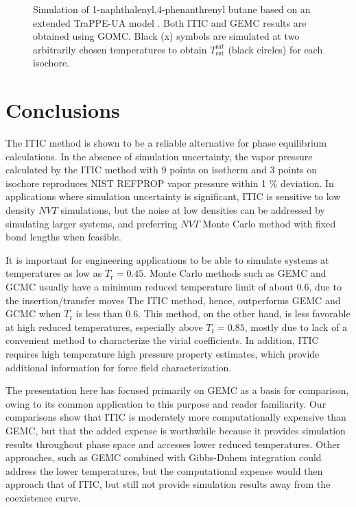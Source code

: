 \documentclass[5p,times]{elsarticle}
\begin{document}
\begin{figure}[]
\centering
{}\label{cc}
\label{aa}
\label{bb}
\caption{
Simulation of 1-naphthalenyl,4-phenanthrenyl butane based on an extended TraPPE-UA model \cite{Yiannourakou2018}. Both ITIC and GEMC results are obtained using GOMC. Black (x) symbols are simulated at two arbitrarily chosen temperatures to obtain $T_\mathrm{est}^\mathrm{sat}$ (black circles) for each isochore.
}
\label{fig:Ex_Sim_TraPPE-1p4nB}
\end{figure}

\section{Conclusions} \label{sec:conclusion} 
The ITIC method is shown to be a reliable alternative for phase equilibrium calculations. In the absence of simulation uncertainty, the vapor pressure calculated by the ITIC method with 9 points on isotherm and 3 points on isochore reproduces NIST REFPROP vapor pressure within 1 \% deviation. In applications where simulation uncertainty is significant, ITIC is sensitive to low density $NVT$ simulations, but the noise at low densities can be addressed by simulating larger systems, and preferring $NVT$ Monte Carlo method with fixed bond lengths when feasible.

It is important for engineering applications to be able to simulate systems at temperatures as low as $T_\mathrm{r}=0.45$. Monte Carlo methods such as GEMC and GCMC usually have a minimum reduced temperature limit of about 0.6, due to the insertion/transfer moves The ITIC method, hence, outperforms GEMC and GCMC when $T_\mathrm{r}$ is less than 0.6. This method, on the other hand, is less favorable at high reduced temperatures, especially above $T_\mathrm{r}=0.85$, mostly due to lack of a convenient method to characterize the virial coefficients. In addition, ITIC requires high temperature high pressure property estimates, which provide additional information for force field characterization.

The presentation here has focused primarily on GEMC as a basis for comparison, owing to its common application to this purpose and reader familiarity. Our comparisons show that ITIC is moderately more computationally expensive than GEMC, but that the added expense is worthwhile because it provides simulation results throughout phase space and accesses lower reduced temperatures. Other approaches, such as GEMC combined with Gibbs-Duhem integration could address the lower temperatures, but the computational expense would then approach that of ITIC, but still not provide simulation results away from the coexistence curve.
\end{document}
